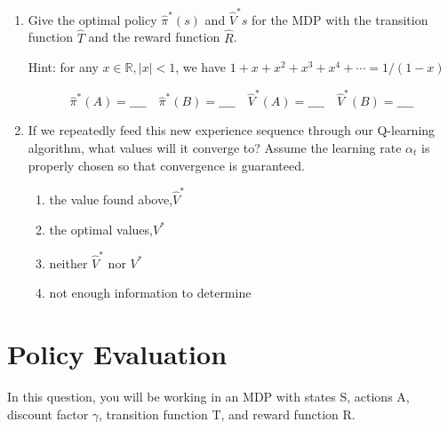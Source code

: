 \documentclass[11pt, answers]{exam}
\begin{document}
\begin{enumerate}
\begin{enumerate}
\item Give the optimal policy $\hat{\pi}^*(s)$ and $\hat{V}^*s$ for the MDP with the transition function $\hat{T}$ and the reward function $\hat{R}$.

Hint: for any $x \in \mathbb{R},|x|<1$, we have $1+x+x^{2}+x^{3}+x^{4}+\cdots=1 /(1-x)$

$$\hat{\pi}^*(A)=\_\_\_\_ \quad \hat{\pi}^*(B)=\_\_\_\_ \quad \hat{V}^*(A)=\_\_\_\_ \quad \hat{V}^*(B)=\_\_\_\_$$

\item If we repeatedly feed this new experience sequence through our Q-learning algorithm, what values will it converge to? Assume the learning rate $\alpha_t$ is properly chosen so that convergence is guaranteed.
\begin{enumerate}
\item the value found above,$\hat{V}^*$
\item the optimal values,$V^*$
\item neither $\hat{V}^*$ nor $V^*$
\item not enough information to determine
\end{enumerate}
\end{enumerate}
\end{enumerate}

\newpage
\section{Policy Evaluation}

In this question, you will be working in an MDP with states S, actions A, discount factor $\gamma$, transition function T, and reward function R.\\
\end{document}
